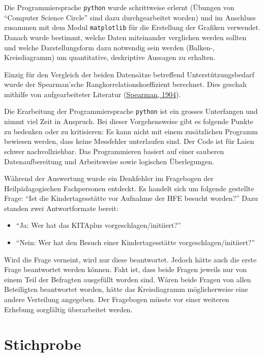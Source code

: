 \documentclass[
  ngerman,
  11pt,
  paper=a4,
  twoside,
  titlepage=true,
  openright,
  abstract=on,
  toc=listofnumbered,
  numbers=noenddot,
  chapterprefix=true,
  headings=optiontohead,
  svgnames,
  dvipsnames]{scrreprt}
\providecommand{\tightlist}{%
  \setlength{\itemsep}{0pt}\setlength{\parskip}{0pt}}
\begin{document}
Die Programmiersprache \texttt{python} wurde schrittweise erlernt
(Übungen von “Computer Science Circle” sind dazu durchgearbeitet worden)
und im Anschluss zusammen mit dem Modul \texttt{matplotlib} für die
Erstellung der Grafiken verwendet. Danach wurde bestimmt, welche Daten
miteinander verglichen werden sollten und welche Darstellungsform dazu
notwendig sein werden (Balken-, Kreisdiagramm) um quantitative,
deskriptive Aussagen zu erhalten.

Einzig für den Vergleich der beiden Datensätze betreffend
Unterstützungsbedarf wurde der Spearman’sche Rangkorrelationskoeffizient
berechnet. Dies geschah mithilfe von aufgearbeiteter Literatur
(\protect\hyperlink{ref-spearmancoeff}{Spearman, 1904}).

Die Erarbeitung der Programmiersprache \texttt{python} ist ein grosses
Unterfangen und nimmt viel Zeit in Anspruch. Bei dieser Vorgehensweise
gibt es folgende Punkte zu bedenken oder zu kritisieren: Es kann nicht
mit einem zusätzlichen Programm bewiesen werden, dass keine Messfehler
unterlaufen sind. Der Code ist für Laien schwer nachvollziehbar. Das
Programmieren basiert auf einer sauberen Datenaufbereitung und
Arbeitsweise sowie logischen Überlegungen.

Während der Auswertung wurde ein Denkfehler im Fragebogen der
Heilpädagogischen Fachpersonen entdeckt. Es handelt sich um folgende
gestellte Frage: “Ist die Kindertagesstätte vor Aufnahme der HFE besucht
worden?” Dazu standen zwei Antwortformate bereit:

\begin{itemize}
\tightlist
\item
  “Ja: Wer hat das KITAplus vorgeschlagen/initiiert?”
\item
  “Nein: Wer hat den Besuch einer Kindertagesstätte
  vorgeschlagen/initiiert?”
\end{itemize}

Wird die Frage verneint, wird nur diese beantwortet. Jedoch hätte auch
die erste Frage beantwortet werden können. Fakt ist, dass beide Fragen
jeweils nur von einem Teil der Befragten ausgefüllt worden sind. Wären
beide Fragen von allen Beteiligten beantwortet worden, hätte das
Kreisdiagramm möglicherweise eine andere Verteilung angegeben. Der
Fragebogen müsste vor einer weiteren Erhebung sorgfältig überarbeitet
werden.

\hypertarget{sec:stichprobe}{%
\section{Stichprobe}\label{sec:stichprobe}}
\end{document}
